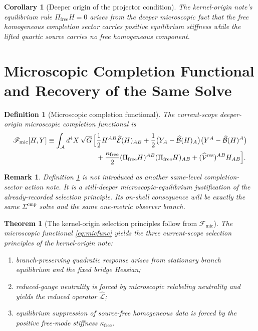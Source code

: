 \documentclass[11pt]{article}
\newcommand{\Sub}{\mathcal A}
\newcommand{\ResidualLift}{\widehat{\mathcal V}^{\mathrm{res}}}
\newcommand{\SubEinLin}{\widehat{\mathcal E}}
\newcommand{\SubGaugeVec}{\widehat{\mathcal B}}
\newcommand{\SubReducedEin}{\widehat{\mathcal L}}
\newcommand{\FreeProj}{\Pi_{\mathrm{free}}}
\newcommand{\GaugeAux}{Y}
\newcommand{\MicFunctional}{\mathscr F_{\mathrm{mic}}}
\newcommand{\FreeStiff}{\kappa_{\mathrm{free}}}
\newtheorem{definition}{Definition}
\newtheorem{remark}{Remark}
\newtheorem{corollary}{Corollary}
\newtheorem{theorem}{Theorem}
\begin{document}
\begin{corollary}[Deeper origin of the projector condition]
\label{cor:projector}
The kernel-origin note's equilibrium rule \(\FreeProj H=0\) arises from the deeper microscopic fact that the free homogeneous completion sector carries positive equilibrium stiffness while the lifted quartic source carries no free homogeneous component.
\end{corollary}

\section{Microscopic Completion Functional and Recovery of the Same Solve}

\begin{definition}[Microscopic completion functional]
\label{def:micfunc}
The current-scope deeper-origin microscopic completion functional is
\begin{equation}
\begin{aligned}
\MicFunctional[H,\GaugeAux]
\equiv
\int_{\Sub} d^4X\,\sqrt{G}\,
\Bigl[
&\frac12 H^{AB}\SubEinLin(H)_{AB}
+\frac12\bigl(\GaugeAux_A-\SubGaugeVec(H)_A\bigr)
\bigl(\GaugeAux^A-\SubGaugeVec(H)^A\bigr)
\\
&+\frac{\FreeStiff}{2}(\FreeProj H)^{AB}(\FreeProj H)_{AB}
+(\ResidualLift)^{AB}H_{AB}
\Bigr].
\end{aligned}
\label{eq:micfunc}
\end{equation}
\end{definition}

\begin{remark}
Definition \ref{def:micfunc} is not introduced as another same-level completion-sector action note. It is a still-deeper microscopic-equilibrium justification of the already-recorded selection principle. Its on-shell consequence will be exactly the same \(\Sigma^{\mathrm{cmp}}\) solve and the same one-metric observer branch.
\end{remark}

\begin{theorem}[The kernel-origin selection principles follow from \(\MicFunctional\)]
\label{thm:principles}
The microscopic functional \eqref{eq:micfunc} yields the three current-scope selection principles of the kernel-origin note:
\begin{enumerate}
    \item branch-preserving quadratic response arises from stationary branch equilibrium and the fixed bridge Hessian;
    \item reduced-gauge neutrality is forced by microscopic relabeling neutrality and yields the reduced operator \(\SubReducedEin\);
    \item equilibrium suppression of source-free homogeneous data is forced by the positive free-mode stiffness \(\FreeStiff\).
\end{enumerate}
\end{theorem}
\end{document}
